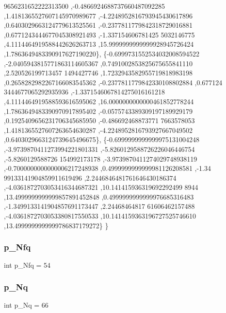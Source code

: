 \begin{DoxyCode}
      9656231652222313500 ,-0.4866924688737660487092285 ,1.4181365527607145970989677 ,-4.2248952816793945430617896
       ,0.6403029663124779613525561 ,-0.2377811779842318729016881 ,0.6771243444677045308921493 ,-1.337154606781425
      5032146775 ,4.1114464919588442626263713 ,15.9999999999999928945726424 ,1.7863649483390917627190220\},
\{-0.6999731552534032008594522 ,-2.0405943815771863114605367 ,0.7491002853825675655841110 ,2.520526199713457
      1494427746 ,1.7232943582955719818983198 ,0.2658282982267166083545362 ,-0.2377811779842330108802884 ,0.677124
      3444677065292935936 ,-1.3371546067814275016161218 ,4.1114464919588593616595062 ,16.0000000000000461852778244
       ,1.7863649483390970917895402 ,-0.0575743389309197189929179 ,0.1925409656231706345685950 ,-0.486692468873771
      7663578053 ,1.4181365527607263654630287 ,-4.2248952816793927667049502 ,0.6403029663124739645496675\},
\{-0.6999999999999975131004248 ,-3.9739870411273994221801331 ,-5.8260129588726226046446754 ,-5.8260129588726
      154992173178 ,-3.9739870411274029748938119 ,-0.7000000000000006217248938 ,0.4999999999999981126208581 ,-1.34
      99133141904859911619496 ,2.2446846481761646430186374 ,-4.0361872703053416344687321 ,10.141415936319692292499
      8944 ,13.4999999999999857891452848 ,0.4999999999999976685316483 ,-1.3499133141904857691173447 ,2.24468464817
      61606462157488 ,-4.0361872703053380817550533 ,10.1414159363196727525746610 ,13.4999999999999786837179272\}
\}
\end{DoxyCode}
\mbox{\label{a00999_aa030b0a9fe619a48647119bacea600e0}} 
\subsubsection{\texorpdfstring{p\+\_\+\+Nfq}{p\_Nfq}}
{\footnotesize\ttfamily int p\+\_\+\+Nfq = 54}

\mbox{\label{a00999_a207fd9268dfef5bf1505928a4f4c774a}} 
\subsubsection{\texorpdfstring{p\+\_\+\+Nq}{p\_Nq}}
{\footnotesize\ttfamily int p\+\_\+\+Nq = 66}

